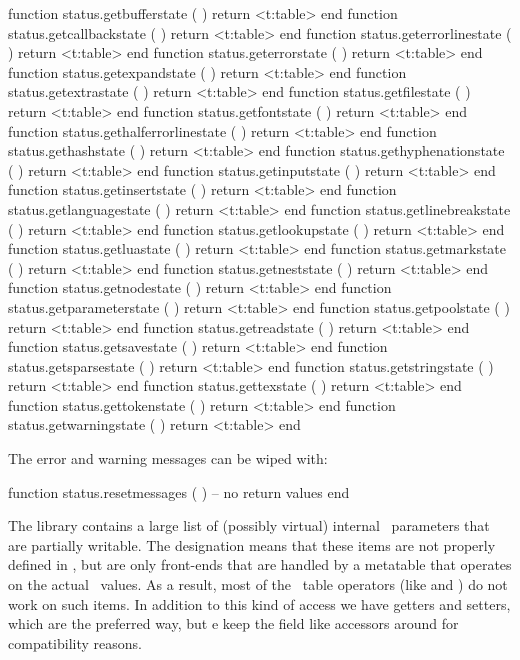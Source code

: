 \starttyping[option=LUA]
function status.getbufferstate        ( ) return <t:table> end
function status.getcallbackstate      ( ) return <t:table> end
function status.geterrorlinestate     ( ) return <t:table> end
function status.geterrorstate         ( ) return <t:table> end
function status.getexpandstate        ( ) return <t:table> end
function status.getextrastate         ( ) return <t:table> end
function status.getfilestate          ( ) return <t:table> end
function status.getfontstate          ( ) return <t:table> end
function status.gethalferrorlinestate ( ) return <t:table> end
function status.gethashstate          ( ) return <t:table> end
function status.gethyphenationstate   ( ) return <t:table> end
function status.getinputstate         ( ) return <t:table> end
function status.getinsertstate        ( ) return <t:table> end
function status.getlanguagestate      ( ) return <t:table> end
function status.getlinebreakstate     ( ) return <t:table> end
function status.getlookupstate        ( ) return <t:table> end
function status.getluastate           ( ) return <t:table> end
function status.getmarkstate          ( ) return <t:table> end
function status.getneststate          ( ) return <t:table> end
function status.getnodestate          ( ) return <t:table> end
function status.getparameterstate     ( ) return <t:table> end
function status.getpoolstate          ( ) return <t:table> end
function status.getreadstate          ( ) return <t:table> end
function status.getsavestate          ( ) return <t:table> end
function status.getsparsestate        ( ) return <t:table> end
function status.getstringstate        ( ) return <t:table> end
function status.gettexstate           ( ) return <t:table> end
function status.gettokenstate         ( ) return <t:table> end
function status.getwarningstate       ( ) return <t:table> end
\stoptyping

The error and warning messages can be wiped with:

\starttyping[option=LUA]
function status.resetmessages ( )
    -- no return values
end
\stoptyping

\stopsection

\startsection[title={Everything \TEX}]

\startsubsection[title={Introduction}]

The  library contains a large list of (possibly virtual) internal
\TEX\ parameters that are partially writable. The designation 
means that these items are not properly defined in \LUA, but are only front-ends
that are handled by a metatable that operates on the actual \TEX\ values. As a
result, most of the \LUA\ table operators (like  and \type {#}) do
not work on such items. In addition to this kind of access we have getters and
setters, which are the preferred way, but e keep the field like accessors around
for compatibility reasons.

